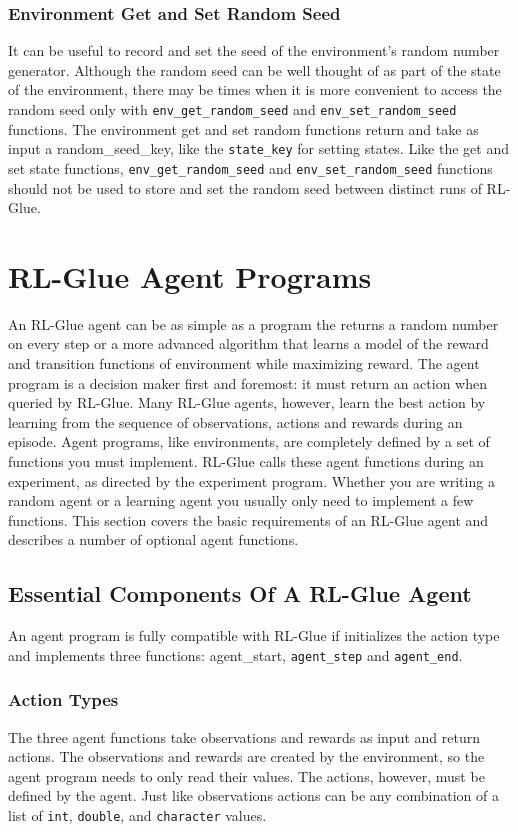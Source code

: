 \documentclass[11pt]{article}
\begin{document}
\subsubsection{Environment Get and Set Random Seed}
It can be useful to record and set the seed of the environment's random number generator. Although the random seed can be well thought of as part of the state of the environment, there may be times when it is more convenient to access the random seed only with \texttt{env\_get\_random\_seed} and \texttt{env\_set\_random\_seed} functions. The environment get and set random functions return and take as input a random\_seed\_key, like the \texttt{state\_key} for setting states. Like the get and set state functions, \texttt{env\_get\_random\_seed} and \texttt{env\_set\_random\_seed} functions should not be used to store and set the random seed between distinct runs of RL-Glue.

\section{RL-Glue Agent Programs}
\label{agent}
An RL-Glue agent can be as simple as a program the returns a random number on every step or a more advanced algorithm that learns a model of the reward and transition functions of environment while maximizing reward. The agent program is a decision maker first and foremost: it must return an action when queried by RL-Glue. Many RL-Glue agents, however, learn the best action by learning from the sequence of observations, actions and rewards during an episode. Agent programs, like environments, are completely defined by a set of functions you must implement. RL-Glue calls these agent functions during an experiment, as directed by the experiment program. Whether you are writing a random agent or a learning agent you usually only need  to implement a few functions. This section covers the basic requirements of an RL-Glue agent and describes a number of optional agent functions.
\subsection{Essential Components Of A RL-Glue Agent}
\label{agentp1}

An agent program is fully compatible with RL-Glue if initializes the action type and implements three functions: agent\_start, \texttt{agent\_step} and \texttt{agent\_end}. 

\subsubsection{Action Types}
The three agent functions take observations and rewards as input and return actions. The observations and rewards are created by the environment, so the agent program needs to only read their values. The actions, however, must be defined by the agent. Just like observations actions can be any combination of a list of \texttt{int}, \texttt{double}, and \texttt{character} values.
\end{document}
